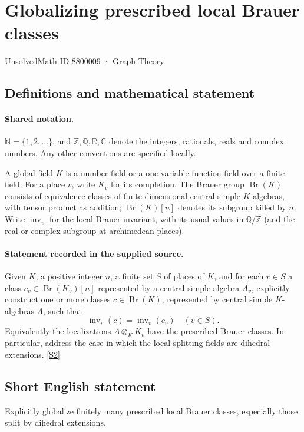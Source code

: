 \documentclass[11pt]{article}
\newcommand{\sref}[2]{\hyperlink{source:#1:#2}{[S#2]}}
\begin{document}
\setcounter{section}{8800008}
\section{Globalizing prescribed local Brauer classes}\label{8800009}
{\small\sffamily UnsolvedMath ID 8800009 · Graph Theory}
\subsection{Definitions and mathematical statement}

\paragraph{Shared notation.}$\mathbb N=\{1,2,\ldots\}$, and $\mathbb Z,\mathbb Q,\mathbb R,\mathbb C$ denote the integers, rationals, reals and complex numbers. Any other conventions are specified locally.


A global field $K$ is a number field or a one-variable function field over a finite field. For a place $v$, write $K_v$ for its completion. The Brauer group $\operatorname{Br}(K)$ consists of equivalence classes of finite-dimensional central simple $K$-algebras, with tensor product as addition; $\operatorname{Br}(K)[n]$ denotes its subgroup killed by $n$. Write $\operatorname{inv}_v$ for the local Brauer invariant, with its usual values in $\mathbb Q/\mathbb Z$ (and the real or complex subgroup at archimedean places).
\paragraph{Statement recorded in the supplied source.}
Given $K$, a positive integer $n$, a finite set $S$ of places of $K$, and for each $v\in S$ a class $c_v\in\operatorname{Br}(K_v)[n]$ represented by a central simple algebra $A_v$, explicitly construct one or more classes $c\in\operatorname{Br}(K)$, represented by central simple $K$-algebras $A$, such that
\[
\operatorname{inv}_v(c)=\operatorname{inv}_v(c_v)\quad(v\in S).
\]
Equivalently the localizations $A\otimes_KK_v$ have the prescribed Brauer classes. In particular, address the case in which the local splitting fields are dihedral extensions. \sref{8800009}{2}

\subsection{Short English statement}
Explicitly globalize finitely many prescribed local Brauer classes, especially those split by dihedral extensions.
\end{document}
